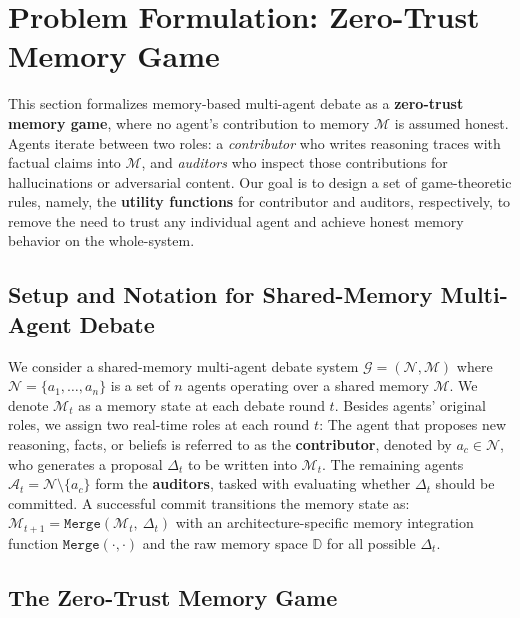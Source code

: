 \section{Problem Formulation: Zero-Trust Memory Game}
\label{sec:problem}

This section formalizes memory-based multi-agent debate as a \textbf{zero-trust memory game}, where no agent's contribution to memory $\mathcal{M}$ is assumed honest.  Agents iterate between two roles: a \emph{contributor} who writes reasoning traces with factual claims into $\mathcal{M}$, and \emph{auditors} who inspect those contributions for hallucinations or adversarial content. Our goal is to design a set of game-theoretic rules, namely, the \textbf{utility functions} for contributor and auditors, respectively, to remove the need to trust any individual agent and achieve honest memory behavior on the whole-system.



\subsection{Setup and Notation for Shared-Memory Multi-Agent Debate}

We consider a shared-memory multi-agent debate system $\mathcal{G} = (\mathcal{N}, \mathcal{M})$ where $\mathcal{N} = \{a_1, \ldots, a_n\}$ is a set of $n$ agents operating over a
shared memory $\mathcal{M}$. We denote $\mathcal{M}_t$ as a memory state at each debate  round $t$. Besides agents' original roles, we assign two real-time roles at each round $t$: The agent that proposes new reasoning, facts, or beliefs is referred to as the \textbf{contributor}, denoted by $a_c \in \mathcal{N}$, who generates a proposal $\Delta_t$ to be written into $\mathcal{M}_t$. The remaining agents $\mathcal{A}_t = \mathcal{N} \setminus \{a_c\}$ form the \textbf{auditors}, tasked with evaluating whether $\Delta_t$ should be committed. A successful commit transitions the memory state as: \(\mathcal{M}_{t+1} = \texttt{Merge}(\mathcal{M}_t,\ \Delta_t)\) with an architecture-specific memory integration function $\texttt{Merge}(\cdot, \cdot)$ and the raw memory space $\mathbb{D}$ for all possible $\Delta_t$.
    




\subsection{The Zero-Trust Memory Game}


